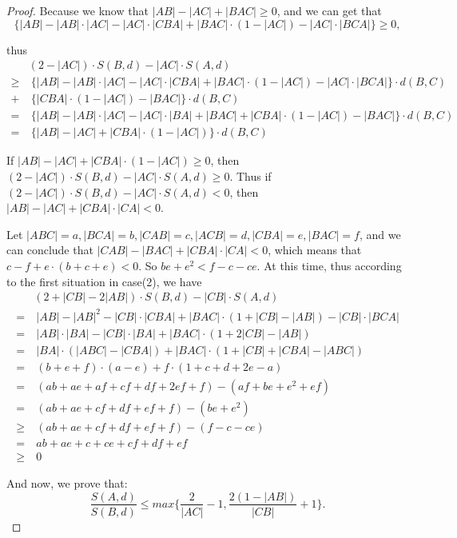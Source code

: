 \documentclass[11pt]{article}
\theoremstyle{remark}
\begin{document}
\begin{proof}
Because we know that $|AB|-|AC|+|BAC|\ge 0$, and we can get that
$$\{|AB|-|AB|\cdot |AC|-|AC|\cdot |CBA| + |BAC|\cdot (1-|AC|) - |AC|\cdot |BCA| \}\ge 0,$$

thus
 \begin{align*}
 & (2-|AC|)\cdot S(B,d) - |AC|\cdot S(A,d) \\
 \ge &\ \{|AB|-|AB|\cdot |AC|-|AC|\cdot |CBA| + |BAC|\cdot (1-|AC|) - |AC|\cdot |BCA| \}\cdot d(B, C) \\
 + &\ \{|CBA|\cdot (1-|AC|) - |BAC|\}\cdot d(B,C) \\
 = &\ \{|AB|-|AB|\cdot |AC|-|AC|\cdot |BA| +|BAC|+|CBA|\cdot (1-|AC|)-|BAC|\}\cdot d(B,C) \\
 = &\ \{|AB| -|AC| + |CBA|\cdot (1-|AC|)\}\cdot d(B,C)
\end{align*}

If $|AB| -|AC| + |CBA|\cdot (1-|AC|)\ge 0$, then $(2-|AC|)\cdot S(B,d) - |AC|\cdot S(A,d)\ge 0$. Thus if $ (2-|AC|)\cdot S(B,d) - |AC|\cdot S(A,d) < 0 $, then $|AB| -|AC| + |CBA|\cdot |CA|< 0$.

Let $|ABC|=a,|BCA|=b,|CAB|=c,|ACB|=d,|CBA|=e,|BAC|=f$, and we can conclude that $|CAB|-|BAC|+|CBA|\cdot |CA|<0$, which means that $c-f+e\cdot (b+c+e)<0$. So $be+e^2<f-c-ce.$ At this time, thus according to the first situation in case(2), we have
\begin{align*}
 & (2+|CB|-2|AB|)\cdot S(B,d)-|CB|\cdot S(A,d)  \\
 = &\ |AB|-|AB|^2 -|CB|\cdot |CBA| + |BAC|\cdot (1+|CB|-|AB|)-|CB|\cdot |BCA|\\
 = &\ |AB|\cdot |BA|-|CB|\cdot |BA| + |BAC|\cdot (1+2|CB|-|AB|)\\
 = &\ |BA|\cdot (|ABC|-|CBA|)+|BAC|\cdot (1+|CB|+|CBA|-|ABC|) \\
 = &\ (b+e+f)\cdot (a-e)+f\cdot (1+c+d+2e-a)  \\
 = &\ (ab+ae+af+cf+df+2ef+f) - (af+be+e^2+ef) \\
 = &\ (ab+ae+cf+df+ef+f)-(be+e^2) \\
 \ge &\ (ab+ae+cf+df+ef+f)-(f-c-ce) \\
 = &\ ab+ae+c+ce+cf+df+ef \\
 \ge &\ 0
\end{align*}

And now, we prove that:
$$ \frac{S(A,d)}{S(B,d)} \le max\{\frac{2}{|AC|}-1 , \frac{2(1-|AB|)}{|CB|} + 1\} .$$

\end{proof}
\end{document}
